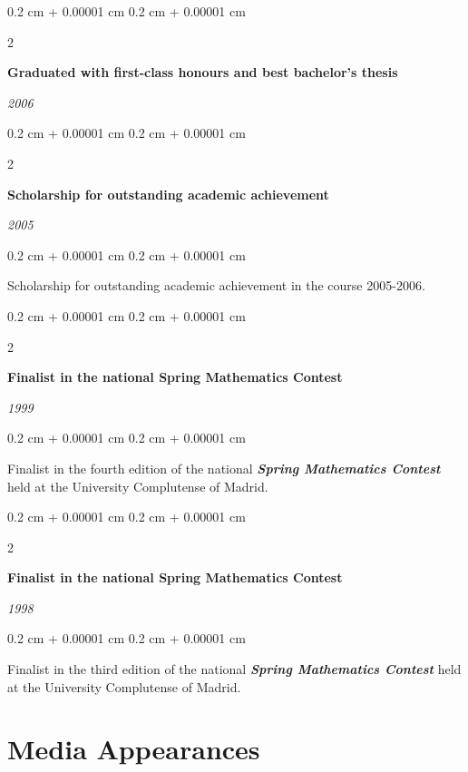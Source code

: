\documentclass[10pt, letterpaper]{article}
\newenvironment{onecolentry}{
	\begin{adjustwidth}{
		0.2 cm + 0.00001 cm
	}{
		0.2 cm + 0.00001 cm
	}
	}{
	\end{adjustwidth}
} %
\newenvironment{twocolentry}[2][]{
	\onecolentry
	\def\secondColumn{#2}
	\setcolumnwidth{\fill, 5.5 cm}
	\begin{paracol}{2}
	}{
		\switchcolumn \raggedleft \secondColumn
	\end{paracol}
	\endonecolentry
} %
\begin{document}
	\vspace{0.2 cm}

	\begin{twocolentry}{
		\textit{2006}}
		\textbf{Graduated with first-class honours and best bachelor's thesis}
	\end{twocolentry}

	\vspace{0.2 cm}

	\begin{twocolentry}{
		\textit{2005}}
		\textbf{Scholarship for outstanding academic achievement}
	\end{twocolentry}

	\vspace{0.10 cm}
	\begin{onecolentry}
		Scholarship for outstanding academic achievement in the course 2005-2006.
	\end{onecolentry}

	\vspace{0.2 cm}

	\begin{twocolentry}{
		\textit{1999}}
		\textbf{Finalist in the national Spring Mathematics Contest}
	\end{twocolentry}

	\vspace{0.10 cm}
	\begin{onecolentry}
		Finalist in the fourth edition of the national \textit{\textbf{Spring Mathematics Contest}} held at the University Complutense of Madrid.
	\end{onecolentry}

	\vspace{0.2 cm}

	\begin{twocolentry}{
		\textit{1998}}
		\textbf{Finalist in the national Spring Mathematics Contest}
	\end{twocolentry}

	\vspace{0.10 cm}
	\begin{onecolentry}
		Finalist in the third edition of the national \textit{\textbf{Spring Mathematics Contest}} held at the University Complutense of Madrid.
	\end{onecolentry}


	\section{Media Appearances}
\end{document}
